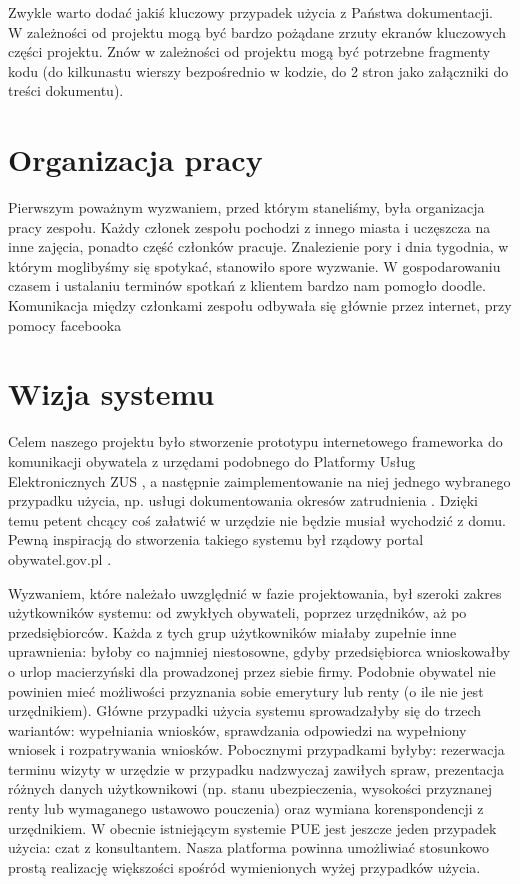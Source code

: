 \documentclass[licencjacka]{pracamgr}
\begin{document}
Zwykle warto dodać jakiś kluczowy przypadek użycia z Państwa dokumentacji. W zależności od projektu mogą być bardzo pożądane zrzuty ekranów kluczowych części projektu. Znów w zależności od projektu mogą być potrzebne fragmenty kodu (do kilkunastu wierszy bezpośrednio w kodzie, do 2 stron jako załączniki do treści dokumentu).

\chapter{Organizacja pracy}

Pierwszym poważnym wyzwaniem, przed którym staneliśmy, była organizacja pracy zespołu. Każdy członek zespołu
pochodzi z innego miasta i uczęszcza na inne zajęcia, ponadto część członków pracuje. Znalezienie pory i dnia
tygodnia, w którym moglibyśmy się spotykać, stanowiło spore wyzwanie. W gospodarowaniu czasem i ustalaniu terminów
spotkań z klientem bardzo nam pomogło doodle. %
Komunikacja między członkami zespołu odbywała się głównie przez internet, przy pomocy facebooka %

\chapter{Wizja systemu}\label{r:wizja}

Celem naszego projektu było stworzenie prototypu internetowego frameworka do komunikacji obywatela z urzędami
podobnego do Platformy Usług Elektronicznych ZUS \cite{zuspue}, a następnie zaimplementowanie na niej jednego
wybranego przypadku użycia, np. usługi dokumentowania okresów zatrudnienia \cite{zusdoz}. Dzięki temu petent chcący
coś załatwić w urzędzie nie będzie musiał wychodzić z domu. Pewną inspiracją do stworzenia takiego systemu był
rządowy portal obywatel.gov.pl \cite{mcobywatel}.

Wyzwaniem, które należało uwzględnić w fazie projektowania, był szeroki zakres użytkowników systemu: od zwykłych
obywateli, poprzez urzędników, aż po przedsiębiorców. Każda z tych grup użytkowników miałaby zupełnie inne uprawnienia:
byłoby co najmniej niestosowne, gdyby przedsiębiorca wnioskowałby o urlop macierzyński dla prowadzonej przez siebie
firmy. Podobnie obywatel nie powinien mieć możliwości przyznania sobie emerytury lub renty (o ile nie jest urzędnikiem). Główne przypadki użycia systemu sprowadzałyby się do trzech wariantów: wypełniania wniosków, sprawdzania
odpowiedzi na wypełniony wniosek i rozpatrywania wniosków. Pobocznymi przypadkami byłyby: rezerwacja terminu wizyty w
urzędzie w przypadku nadzwyczaj zawiłych spraw, prezentacja różnych danych użytkownikowi (np. stanu ubezpieczenia,
wysokości przyznanej renty lub wymaganego ustawowo pouczenia) oraz wymiana korenspondencji z urzędnikiem. W obecnie
istniejącym systemie PUE jest jeszcze jeden przypadek użycia: czat z konsultantem. Nasza platforma powinna umożliwiać
stosunkowo prostą realizację większości spośród wymienionych wyżej przypadków użycia.
\end{document}
